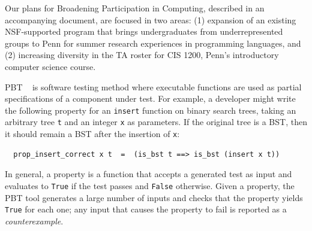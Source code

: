 
\iflater
{}
\fi

\iflater
{}
\fi

Our plans for Broadening Participation in Computing, described in an
accompanying document, are focused in two areas: (1) expansion of an
existing NSF-supported program that brings undergraduates from
underrepresented groups to Penn for summer research experiences in
programming languages, and (2) increasing diversity in the TA roster
for CIS 1200, Penn's introductory computer science course.



%
PBT%
~\cite{hughes2007quickcheck}
is software testing method where
executable functions are used as partial
specifications of a component under test. For example, a developer might
write the following property for an \lstinline{insert}
function on binary search trees, taking an arbitrary tree \texttt{t}
and an integer
\texttt{x} as parameters. If the original tree
is a BST, then it should remain
a BST after the insertion of \texttt{x}:
\begin{lstlisting}
  prop_insert_correct x t  =  (is_bst t ==> is_bst (insert x t))
\end{lstlisting}
In general, a property is a function that
accepts a generated
test as input \iflater{}\fi
and evaluates to \lstinline{True} if the test passes and
\lstinline{False} otherwise.
Given a property, the PBT tool generates a
large number of inputs and
checks that the property yields \lstinline{True} for each one; any input
that causes the property to fail is reported as a {\em counterexample}.


